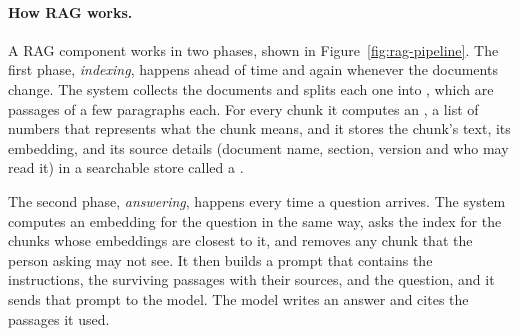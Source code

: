 \paragraph{How RAG works.} A RAG component works in two phases, shown in Figure~\ref{fig:rag-pipeline}. The first phase, \emph{indexing}, happens ahead of time and again whenever the documents change. The system collects the documents and splits each one into , which are passages of a few paragraphs each. For every chunk it computes an , a list of numbers that represents what the chunk means, and it stores the chunk's text, its embedding, and its source details (document name, section, version and who may read it) in a searchable store called a .

The second phase, \emph{answering}, happens every time a question arrives. The system computes an embedding for the question in the same way, asks the index for the chunks whose embeddings are closest to it, and removes any chunk that the person asking may not see. It then builds a prompt that contains the instructions, the surviving passages with their sources, and the question, and it sends that prompt to the model. The model writes an answer and cites the passages it used.

